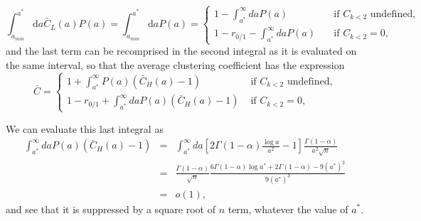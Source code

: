 \documentclass[ twocolumn,
 amsmath,amssymb,
 aps, pre, amsthm, amsfonts,
]{revtex4-2}
\newcommand{\nn}{\nonumber}
\begin{document}
\begin{equation}
    \int_{a_{min}}^{a^*} {\mathrm d}a \bar{C}_L(a) P(a) = \int_{a_{min}}^{a^*} {\mathrm d}a  P(a) = \begin{cases}
        1 - \int_{a^*}^{\infty} da P(a) \quad &\text{if } C_{k<2} \text{ undefined,} \\
         1 - r_{0/1} - \int_{a^*}^{\infty} da P(a) \quad &\text{if } C_{k<2} = 0,
    \end{cases} 
\end{equation}
and the last term can be recomprised in the second integral as it is evaluated on the same interval, so that the average clustering coefficient has the expression
\begin{equation}
    \bar{C} = \begin{cases}
        1 + \int_{a^*}^{\infty} P(a) (\bar{C}_H(a) - 1)& \text{ if } C_{k<2} \text{ undefined,} \\
        1 - r_{0/1} +\int_{a^*}^{\infty} da P(a) (\bar{C}_H(a) - 1) & \text{ if } C_{k<2} = 0,
    \end{cases}
\end{equation}

We can evaluate this last integral as
\begin{eqnarray}
    \int_{a^*}^{\infty} da P(a) (\bar{C}_H(a) - 1) &=& \int_{a^*}^{\infty} da \left[ 2 \Gamma(1-\alpha) \frac{\log a}{a^2} - 1\right]\frac{\Gamma(1-\alpha)}{a^2 \sqrt{n}}\\
    &=& \frac{\Gamma(1-\alpha)}{\sqrt{n}} \frac{6 \Gamma(1-\alpha) \log a^* + 2 \Gamma(1-\alpha) - 9 (a^*)^2}{ 9 (a^*)^3}\nn\\
    &=& o(1),\nn
\end{eqnarray}
and see that it is suppressed by a square root of $n$ term, whatever the value of $a^*$. 
\end{document}
